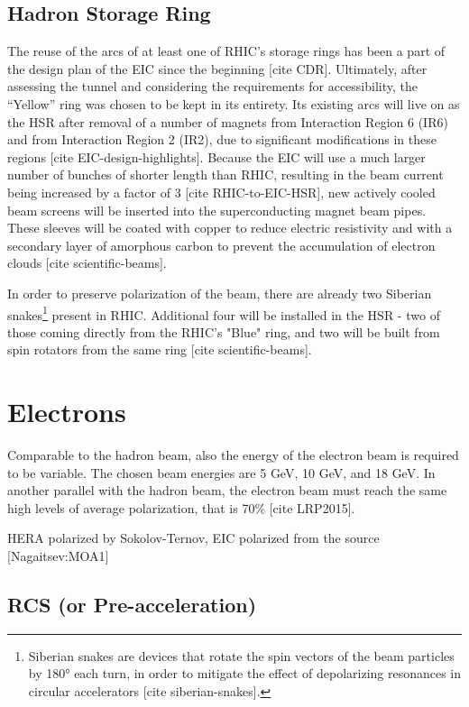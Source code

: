 \subsection{Hadron Storage Ring}
The reuse of the arcs of at least one of RHIC's storage rings has been a part of the design plan of the EIC since the beginning [cite CDR]. Ultimately, after assessing the tunnel and considering the requirements for accessibility, the “Yellow” ring was chosen to be kept in its entirety. Its existing arcs will live on as the HSR after removal of a number of magnets from Interaction Region 6 (IR6) and from Interaction Region 2 (IR2), due to significant modifications in these regions [cite EIC-design-highlights]. Because the EIC will use a much larger number of bunches of shorter length than RHIC, resulting in the beam current being increased by a factor of 3 [cite RHIC-to-EIC-HSR], new actively cooled beam screens will be inserted into the superconducting magnet beam pipes. These sleeves will be coated with copper to reduce electric resistivity and with a secondary layer of amorphous carbon to prevent the accumulation of electron clouds [cite scientific-beams]. 

In order to preserve polarization of the beam, there are already two Siberian snakes\footnote{Siberian snakes are devices that rotate the spin vectors of the beam particles by \ang{180} each turn, in order to mitigate the effect of depolarizing resonances in circular accelerators [cite siberian-snakes].} present in RHIC. Additional four will be installed in the HSR - two of those coming directly from the RHIC's "Blue" ring, and two will be built from spin rotators from the same ring [cite scientific-beams].


\section{Electrons}
Comparable to the hadron beam, also the energy of the electron beam is required to be variable. The chosen beam energies are 5 GeV, 10 GeV, and 18 GeV. In another parallel with the hadron beam, the electron beam must reach the same high levels of average polarization, that is 70\% [cite LRP2015]. 

HERA polarized by Sokolov-Ternov, EIC polarized from the source [Nagaitsev:MOA1]

\subsection{RCS (or Pre-acceleration)}


